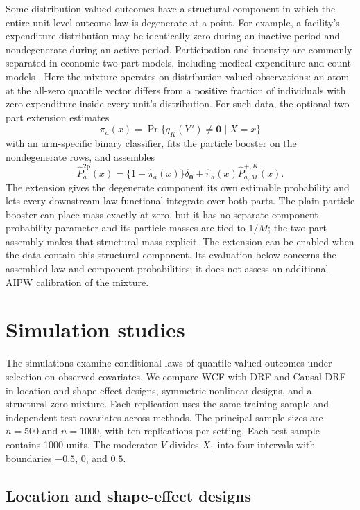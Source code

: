\documentclass[11pt]{article}
\begin{document}
Some distribution-valued outcomes have a structural component in which the
entire unit-level outcome law is degenerate at a point. For example, a facility's expenditure distribution may be identically zero during an inactive period and nondegenerate during an active period. Participation and intensity are commonly separated in economic two-part models, including medical expenditure and count models \citep{duan1983medical,mullahy1986modified}. Here the mixture operates on distribution-valued observations: an atom at the all-zero quantile vector differs from a positive fraction of individuals with zero expenditure inside every unit's distribution. For such data, the optional two-part extension
estimates
\[
 \pi_a(x)=\Pr\{q_K(Y^a)\neq\mathbf{0}\mid X=x\}
\]
with an arm-specific binary classifier, fits the particle booster on the
nondegenerate rows, and assembles
\[
 \widehat P_a^{\mathrm{2p}}(x)=
 \{1-\widehat\pi_a(x)\}\delta_{\mathbf{0}}
 +\widehat\pi_a(x)\widehat P_{a,M}^{+,K}(x).
\]
The extension gives the degenerate component its own estimable probability
and lets every downstream law functional integrate over both parts. The plain
particle booster can place mass exactly at zero, but it has no
separate component-probability parameter and its particle masses are tied to
$1/M$; the two-part assembly makes that structural mass explicit. The extension can be enabled when the data contain this structural component. Its evaluation below concerns the assembled law and component probabilities; it does not assess an additional AIPW calibration of the mixture.
\section{Simulation studies}\label{sec:simulations}

The simulations examine conditional laws of quantile-valued outcomes under selection on observed covariates. We compare WCF with DRF and Causal-DRF in location and shape-effect designs, symmetric nonlinear designs, and a structural-zero mixture. Each replication uses the same training sample and independent test covariates across methods. The principal sample sizes are $n=500$ and $n=1000$, with ten replications per setting. Each test sample contains 1000 units. The moderator $V$ divides $X_1$ into four intervals with boundaries $-0.5$, $0$, and $0.5$.

\subsection{Location and shape-effect designs}\label{sec:income-design}
\end{document}
